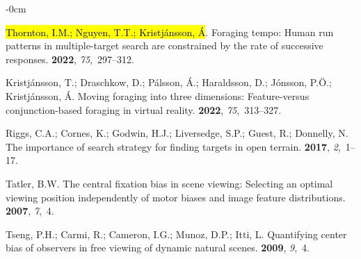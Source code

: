 \documentclass[vision,article,accept,pdftex,moreauthors]{Definitions/mdpi}
\begin{document}
\begin{adjustwidth}{-\extralength}{0cm}
\begin{thebibliography}{999}
\hl{Thornton, I.M.; Nguyen, T.T.; Kristj{\'a}nsson, {\'A}}.
\newblock Foraging tempo: Human run patterns in multiple-target search are
  constrained by the rate of successive responses.
 {\bf 2022}, {\em
  75},~297--312.

Kristj{\'a}nsson, T.; Draschkow, D.; P{\'a}lsson, {\'A}.; Haraldsson, D.;
  J{\'o}nsson, P.{\"O}.; Kristj{\'a}nsson, {\'A}.
\newblock Moving foraging into three dimensions: Feature-versus
  conjunction-based foraging in virtual reality.
 {\bf 2022}, {\em
  75},~313--327.

Riggs, C.A.; Cornes, K.; Godwin, H.J.; Liversedge, S.P.; Guest, R.; Donnelly,
  N.
\newblock The importance of search strategy for finding targets in open
  terrain.
 {\bf 2017},
  {\em 2},~1--17.

Tatler, B.W.
\newblock The central fixation bias in scene viewing: Selecting an optimal
  viewing position independently of motor biases and image feature
  distributions.
 {\bf 2007}, {\em 7},~4.

Tseng, P.H.; Carmi, R.; Cameron, I.G.; Munoz, D.P.; Itti, L.
\newblock Quantifying center bias of observers in free viewing of dynamic
  natural scenes.
 {\bf 2009}, {\em 9},~4.

\end{thebibliography}

\end{adjustwidth}
\end{document}
